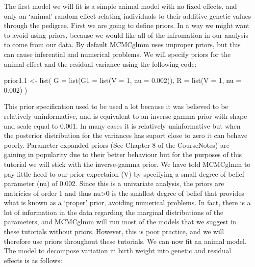 \documentclass[
  12pt,
]{book}
\newenvironment{Shaded}{\begin{snugshade}}{\end{snugshade}}
\newcommand{\AttributeTok}[1]{\textcolor[rgb]{0.77,0.63,0.00}{#1}}
\newcommand{\DecValTok}[1]{\textcolor[rgb]{0.00,0.00,0.81}{#1}}
\newcommand{\FloatTok}[1]{\textcolor[rgb]{0.00,0.00,0.81}{#1}}
\newcommand{\FunctionTok}[1]{\textcolor[rgb]{0.00,0.00,0.00}{#1}}
\newcommand{\NormalTok}[1]{#1}
\newcommand{\OtherTok}[1]{\textcolor[rgb]{0.56,0.35,0.01}{#1}}
\begin{document}
The first model we will fit is a simple animal model with no fixed effects, and only an `animal' random effect relating individuals to their additive genetic values through the pedigree. First we are going to define priors. In a way we might want to avoid using priors, because we would like all of the infromation in our analysis to come from our data. By default MCMCglmm uses improper priors, but this can cause inferential and numerical problems. We will specify priors for the animal effect and the residual variance using the following code:

\begin{Shaded}
\begin{Highlighting}[]
\NormalTok{prior1}\FloatTok{.1} \OtherTok{\textless{}{-}} \FunctionTok{list}\NormalTok{(}
  \AttributeTok{G =} \FunctionTok{list}\NormalTok{(}\AttributeTok{G1 =} \FunctionTok{list}\NormalTok{(}\AttributeTok{V =} \DecValTok{1}\NormalTok{, }\AttributeTok{nu =} \FloatTok{0.002}\NormalTok{)),}
  \AttributeTok{R =} \FunctionTok{list}\NormalTok{(}\AttributeTok{V =} \DecValTok{1}\NormalTok{, }\AttributeTok{nu =} \FloatTok{0.002}\NormalTok{)}
\NormalTok{)}
\end{Highlighting}
\end{Shaded}

This prior specification used to be used a lot because it was believed to be relatively uninformative, and is equivalent to an inverse-gamma prior with shape and scale equal to 0.001. In many cases it is relatively uninformative but when the posterior distribution for the variances has suport close to zero it can behave poorly. Parameter expanded priors (See Chapter 8 of the CourseNotes) are gaining in popularity due to their better behaviour but for the purposes of this tutorial we will stick with the inverse-gamma prior. We have told MCMCglmm to pay little heed to our prior expectaion (V) by specifying a small degree of belief parameter (nu) of 0.002. Since this is a univariate analysis, the priors are matricies of order 1 and thus nu\textgreater0 is the smallest degree of belief that provides what is known as a `proper' prior, avoiding numerical problems. In fact, there is a lot of information in the data regarding the marginal distributions of the parameters, and MCMCglmm will run most of the models that we suggest in these tutorials without priors. However, this is poor practice, and we will therefore use priors throughout these tutorials. We can now fit an animal model. The model to decompose variation in birth weight into genetic and residual effects is as follows:
\end{document}
